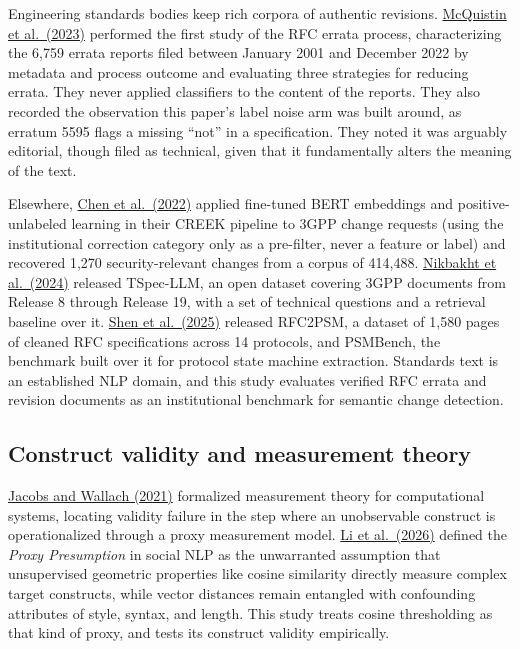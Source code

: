 \documentclass[11pt]{article}
\begin{document}
Engineering standards bodies keep rich corpora of authentic revisions. \hyperlink{bib:mcquistin}{McQuistin et al.\ (2023)} performed the first study of the RFC errata process, characterizing the 6,759 errata reports filed between January 2001 and December 2022 by metadata and process outcome and evaluating three strategies for reducing errata. They never applied classifiers to the content of the reports. They also recorded the observation this paper's label noise arm was built around, as erratum 5595 flags a missing ``not'' in a specification. They noted it was arguably editorial, though filed as technical, given that it fundamentally alters the meaning of the text.

Elsewhere, \hyperlink{bib:chen}{Chen et al.\ (2022)} applied fine-tuned BERT embeddings and positive-unlabeled learning in their CREEK pipeline to 3GPP change requests (using the institutional correction category only as a pre-filter, never a feature or label) and recovered 1,270 security-relevant changes from a corpus of 414,488. \hyperlink{bib:nikbakht}{Nikbakht et al.\ (2024)} released TSpec-LLM, an open dataset covering 3GPP documents from Release 8 through Release 19, with a set of technical questions and a retrieval baseline over it. \hyperlink{bib:shen}{Shen et al.\ (2025)} released RFC2PSM, a dataset of 1,580 pages of cleaned RFC specifications across 14 protocols, and PSMBench, the benchmark built over it for protocol state machine extraction. Standards text is an established NLP domain, and this study evaluates verified RFC errata and revision documents as an institutional benchmark for semantic change detection.

\subsection{Construct validity and measurement theory}

\hyperlink{bib:jacobs}{Jacobs and Wallach (2021)} formalized measurement theory for computational systems, locating validity failure in the step where an unobservable construct is operationalized through a proxy measurement model. \hyperlink{bib:li}{Li et al.\ (2026)} defined the \emph{Proxy Presumption} in social NLP as the unwarranted assumption that unsupervised geometric properties like cosine similarity directly measure complex target constructs, while vector distances remain entangled with confounding attributes of style, syntax, and length. This study treats cosine thresholding as that kind of proxy, and tests its construct validity empirically.
\end{document}
